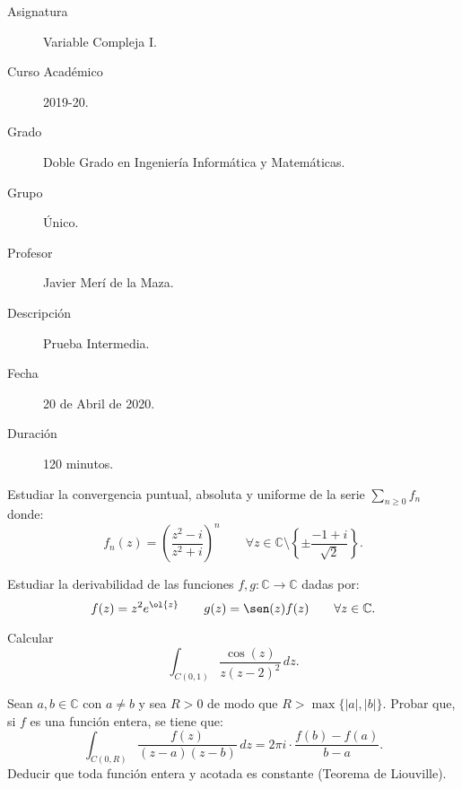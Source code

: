 \documentclass[12pt]{article}
\begin{document}

    
    

    \begin{description}
        \item[Asignatura] Variable Compleja I.
        \item[Curso Académico] 2019-20.
        \item[Grado] Doble Grado en Ingeniería Informática y Matemáticas.
        \item[Grupo] Único.
        \item[Profesor] Javier Merí de la Maza.
        \item[Descripción] Prueba Intermedia.
        \item[Fecha] 20 de Abril de 2020.
        \item[Duración] 120 minutos.
    \end{description}
    \newpage

    \begin{ejercicio}[3 puntos]
        Estudiar la convergencia puntual, absoluta y uniforme de la serie $\sum\limits_{n \geq 0} f_n$ donde:
        \[
            f_n(z) = \left(\dfrac{z^2-i}{z^2+i}\right)^n\qquad \forall z \in \mathbb{C} \setminus \left\{\pm \dfrac{-1+i}{\sqrt{2}}\right\}.
        \]
    \end{ejercicio}

    \begin{ejercicio}[3 puntos]
        Estudiar la derivabilidad de las funciones $f,g : \mathbb{C} \to \mathbb{C}$ dadas por:
        \[
            f(z) = z^2 e^{\ol{z}}
            \qquad g(z) = \sen(z) f(z) \qquad \forall z \in \mathbb{C}.
        \]
    \end{ejercicio}

    \begin{ejercicio}[1 punto]
        Calcular
        \[
            \int_{C(0,1)} \dfrac{\cos(z)}{z(z-2)^2} \, dz.
        \]
    \end{ejercicio}

    \begin{ejercicio}[3 puntos]
        Sean $a,b \in \mathbb{C}$ con $a \neq b$ y sea $R > 0$ de modo que $R > \max\{|a|,|b|\}$. Probar que, si $f$ es una función entera, se tiene que:
        \[
            \int_{C(0,R)} \dfrac{f(z)}{(z-a)(z-b)} \, dz = 2\pi i \cdot \dfrac{f(b) - f(a)}{b-a}.
        \]
        Deducir que toda función entera y acotada es constante (Teorema de Liouville).
    \end{ejercicio}
\end{document}
